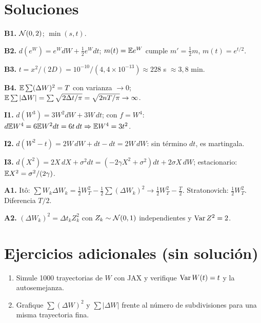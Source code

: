 \documentclass[11pt,a4paper]{article}
\begin{document}
\section{Soluciones}
\begin{solucion}
\textbf{B1.} $\mathcal{N}(0,2)$; $\min(s,t)$.

\textbf{B2.} $d(e^W)=e^WdW+\frac12e^Wdt$; $m(t)=\mathbb{E} e^{W}$ cumple $m'=\frac12m$, $m(t)=e^{t/2}$.

\textbf{B3.} $t=x^2/(2D)=10^{-10}/(4{,}4\times10^{-13})\approx228$ s $\approx3{,}8$ min.

\textbf{B4.} $\mathbb{E}\sum(\Delta W)^2=T$ con varianza $\to0$; $\mathbb{E}\sum|\Delta W|=\sum\sqrt{2\Delta t/\pi}=\sqrt{2nT/\pi}\to\infty$.

\textbf{I1.} $d(W^3)=3W^2dW+3W\,dt$; con $f=W^4$: $d\mathbb{E} W^4=6\mathbb{E} W^2dt=6t\,dt\Rightarrow\mathbb{E} W^4=3t^2$.

\textbf{I2.} $d(W^2-t)=2W\,dW+dt-dt=2W\,dW$: sin término $dt$, es martingala.

\textbf{I3.} $d(X^2)=2X\,dX+\sigma^2dt=(-2\gamma X^2+\sigma^2)dt+2\sigma X\,dW$; estacionario: $\mathbb{E} X^2=\sigma^2/(2\gamma)$.

\textbf{A1.} Itô: $\sum W_k\Delta W_k=\frac12W_T^2-\frac12\sum(\Delta W_k)^2\to\frac12W_T^2-\frac T2$. Stratonovich: $\frac12W_T^2$. Diferencia $T/2$.

\textbf{A2.} $(\Delta W_k)^2=\Delta t_kZ_k^2$ con $Z_k\sim\mathcal{N}(0,1)$ independientes y $\operatorname{Var} Z^2=2$.
\end{solucion}

\section{Ejercicios adicionales (sin solución)}
\begin{enumerate}[label=\textbf{P\arabic*.}]
\item Simule 1000 trayectorias de $W$ con JAX y verifique $\operatorname{Var} W(t)=t$ y la autosemejanza.
\item Grafique $\sum(\Delta W)^2$ y $\sum|\Delta W|$ frente al número de subdivisiones para una misma trayectoria fina.
\end{enumerate}
\end{document}

